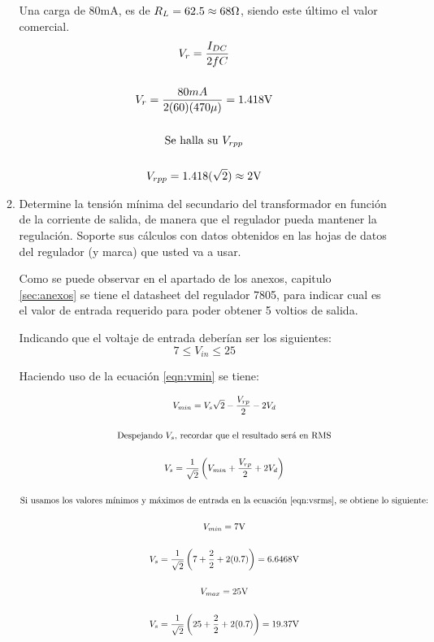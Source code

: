 \begin{enumerate}
\begin{enumerate}
                    Una carga de 80mA, es de $R_L=62.5 \approx 68\ohm$, siendo este último el valor comercial.
                    \begin{gather}
                        V_r= \dfrac{I_{DC}}{2fC}\label{eqn:vr}\\[0.5cm]
                        V_r=\dfrac{80mA}{2(60)(470\mu)}=1.418\volt\nonumber\\[0.5cm]
                        \text{Se halla su $V_{rpp}$}\nonumber\\[0.5cm]
                        V_{rpp}=1.418(\sqrt{2})\approx 2\volt\nonumber
                    \end{gather}

                \item Determine la tensión mínima del secundario del transformador en función de la corriente de salida, de manera que el regulador pueda mantener la regulación. Soporte sus cálculos con datos obtenidos en las hojas de datos del regulador (y marca) que usted va a usar.

                    Como se puede observar en el apartado de los anexos, capitulo \ref{sec:anexos} se tiene el datasheet del regulador 7805, para indicar cual es el valor de entrada requerido para poder obtener 5 voltios de salida. 

                    Indicando que el voltaje de entrada deberían ser los siguientes: $$7\leq V_{in} \leq 25$$

                    Haciendo uso de la ecuación \ref{eqn:vmin} se tiene:

                    \begin{gather}
                        V_{min} = V_s\sqrt{2} - \dfrac{V_{rp}}{2} - 2V_d \label{eqn:vmin}\\[0.5cm]
                        \text{Despejando $V_s$, recordar que el resultado será en RMS}\nonumber \\[0.5cm]
                        V_s = \dfrac{1}{\sqrt{2}}\left(V_{min} + \dfrac{V_{rp}}{2} + 2V_d\right)\label{eqn:vsrms}\\[0.5cm]
                        \text{Si usamos los valores mínimos y máximos de entrada en la ecuación \ref{eqn:vsrms}, se obtiene lo siguiente:}\nonumber \\[0.5cm]
                        V_{min} = 7\volt \nonumber \\[0.5cm]
                        V_s = \dfrac{1}{\sqrt{2}}\left(7 + \dfrac{2}{2} + 2(0.7)\right) = 6.6468\volt \nonumber\\[0.5cm]
                        V_{max} = 25 \volt \nonumber \\[0.5cm]
                        V_s = \dfrac{1}{\sqrt{2}}\left(25 + \dfrac{2}{2} + 2(0.7)\right) = 19.37\volt \nonumber
                    \end{gather}


\end{enumerate}
\end{enumerate}
